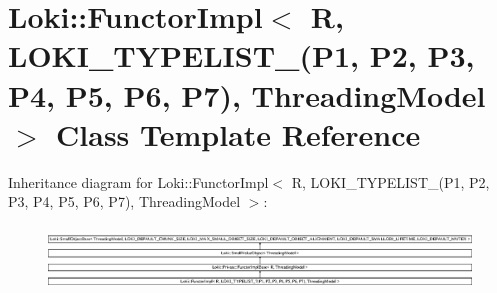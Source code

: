 \hypertarget{classLoki_1_1FunctorImpl_3_01R_00_01LOKI__TYPELIST__7_07P1_00_01P2_00_01P3_00_01P4_00_01P5_00_01b06f56baa72992ebef0383deced9a1f5}{}\section{Loki\+:\+:Functor\+Impl$<$ R, L\+O\+K\+I\+\_\+\+T\+Y\+P\+E\+L\+I\+S\+T\+\_(P1, P2, P3, P4, P5, P6, P7), Threading\+Model $>$ Class Template Reference}
\label{classLoki_1_1FunctorImpl_3_01R_00_01LOKI__TYPELIST__7_07P1_00_01P2_00_01P3_00_01P4_00_01P5_00_01b06f56baa72992ebef0383deced9a1f5}
Inheritance diagram for Loki\+:\+:Functor\+Impl$<$ R, L\+O\+K\+I\+\_\+\+T\+Y\+P\+E\+L\+I\+S\+T\+\_(P1, P2, P3, P4, P5, P6, P7), Threading\+Model $>$\+:\begin{figure}[H]
\begin{center}
\leavevmode
\includegraphics[height=1.751368cm]{classLoki_1_1FunctorImpl_3_01R_00_01LOKI__TYPELIST__7_07P1_00_01P2_00_01P3_00_01P4_00_01P5_00_01b06f56baa72992ebef0383deced9a1f5}
\end{center}
\end{figure}
